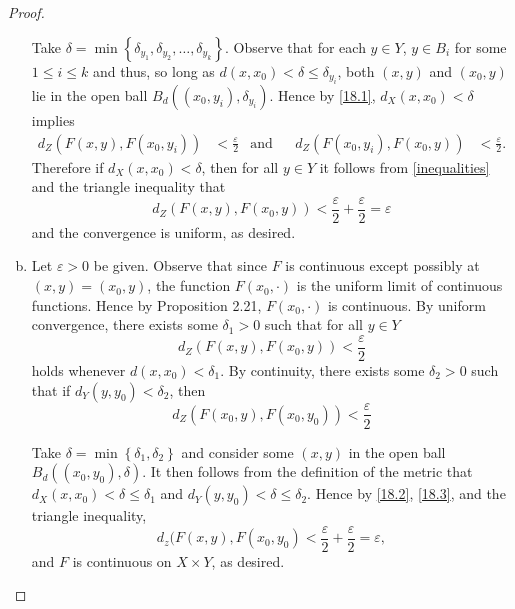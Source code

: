 \documentclass[12pt]{amsart}
\begin{document}
\begin{setup}
\begin{proof}
\begin{enumerate}[(a)]
      Take $\delta = \min \left\{\delta_{y_1}, \delta_{y_2}, \ldots, \delta_{y_k}\right\}$.
      Observe that for each $y \in Y$,  $y \in B_i$ for some $1 \leq i \leq k$ and thus, so long as $d(x, x_0) < \delta \leq \delta_{y_i}$, both $(x, y)$ and $(x_0, y)$ lie in the open ball $B_d\left(\left(x_0, y_i\right), \delta_{y_i}\right)$.
      Hence by \eqref{18.1}, $d_X(x,x_0) < \delta$ implies
      \begin{align*}\label{inequalities}\tag{$\ast$}
        d_Z\left(F\left(x, y\right), F\left(x_0, y_i\right)\right) &< \frac{\varepsilon}{2} & \text{and}&& d_Z\left(F\left(x_0, y_i\right), F\left(x_0, y\right)\right) &< \frac{\varepsilon}{2}.
      \end{align*}
      Therefore if $d_X(x,x_0) < \delta$, then for all $y \in Y$ it follows from \eqref{inequalities} and the triangle inequality that
      $$d_Z(F(x, y), F(x_0, y)) < \frac{\varepsilon}{2} + \frac{\varepsilon}{2} = \varepsilon$$
      and the convergence is uniform, as desired.
    \item
      Let $\varepsilon > 0$ be given.
      Observe that since $F$ is continuous except possibly at $(x,y) = (x_0, y)$, the function $F(x_0, \cdot)$ is the uniform limit of continuous functions.
      Hence by Proposition 2.21, $F(x_0, \cdot)$ is continuous.
      By uniform convergence, there exists some $\delta_1 > 0$ such that for all $y \in Y$
      \begin{equation}\label{18.2}
        d_Z\left(F\left(x,y\right), F\left(x_0, y\right)\right) < \frac{\varepsilon}{2}
      \end{equation}
      holds whenever $d(x, x_0) < \delta_1$.
      By continuity, there exists some $\delta_2 > 0$ such that if $d_Y(y,y_0) < \delta_2$, then
      \begin{equation}\label{18.3}
        d_Z\left(F\left(x_0,y\right), F\left(x_0, y_0\right)\right) < \frac{\varepsilon}{2}
      \end{equation}

      Take $\delta = \min \left\{\delta_1, \delta_2\right\}$ and consider some $(x,y)$ in the open ball $B_d((x_0, y_0), \delta)$.
      It then follows from the definition of the metric that $d_X(x, x_0) < \delta \leq \delta_1$ and $d_Y(y,y_0) < \delta \leq \delta_2$.
      Hence by \eqref{18.2}, \eqref{18.3}, and the triangle inequality,
      $$d_z(F(x,y), F(x_0,y_0) < \frac{\varepsilon}{2} + \frac{\varepsilon}{2} = \varepsilon,$$
      and $F$ is continuous on $X \times Y$, as desired.
    \end{enumerate}
  \end{proof}
\end{setup}
\end{document}
